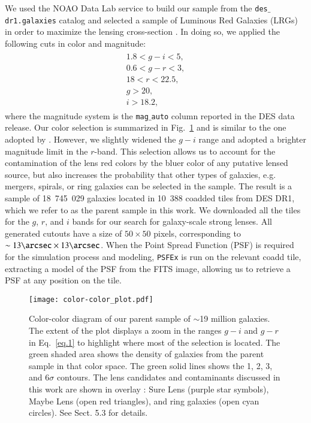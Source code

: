 \documentclass[tradiabstract,twocolumn]{aa}
\begin{document}
We used the NOAO Data Lab \citep{Fitzpatrick2016} service to build our sample from the {\tt des$\_$dr1.galaxies} catalog and selected a sample of Luminous Red Galaxies (LRGs) in order to maximize the lensing cross-section \citep[e.g.][]{Turner1984}. In doing so, we applied the following cuts in color and magnitude: 
%
\begin{eqnarray}
\begin{array}{l}
1.8 < g - i < 5, \\
0.6 < g - r < 3, \\
18 < r < 22.5, \\
g > 20, \\
i > 18.2,
\label{eq.1}
\end{array} 
\end{eqnarray}
% 
\noindent where the magnitude system is the {\tt mag$\_$auto} column reported in the DES data release. Our color selection is summarized in Fig.~\ref{Fig.colorplot} and is similar to the one adopted by \cite{Jacobs2019A}. However, we slightly widened the $g-i$ range and adopted a brighter magnitude limit in the $r$-band. This selection allows us to account for the contamination of the lens red colors by the bluer color of any putative lensed source, but also increases the probability that other types of galaxies, e.g. mergers, spirals, or ring galaxies can be selected in the sample. The result is a sample of 18~745~029 galaxies located in 10~388 coadded tiles from DES DR1, which we refer to as the parent sample in this work. We downloaded all the tiles for the $g$, $r$, and $i$ bands for our search for galaxy-scale strong lenses. All generated cutouts have a size of $50 \times 50$ pixels, corresponding to $\sim 13 \arcsec\times 13 \arcsec$. When the Point Spread Function (PSF) is required for the simulation process and modeling, {\tt PSFEx} \citep{bertin2011} is run on the relevant coadd tile, extracting a model of the PSF from the FITS image, allowing us to retrieve a PSF at any position on the tile.

\begin{figure}[t!]
\centering
\texttt{[image: color-color\_plot.pdf]}
\caption{Color-color diagram of our parent sample of $\sim$19 million galaxies. The extent of the plot displays a zoom in the ranges $g-i$ and $g-r$ in  Eq.~\ref{eq.1} to highlight where most of the selection is located. The green shaded area shows the density of galaxies from the parent sample in that color space. The green solid lines shows the 1, 2, 3, and 6$\sigma$ contours. The lens candidates and contaminants discussed in this work are shown in overlay : Sure Lens (purple star symbols), Maybe Lens (open red triangles), and ring galaxies (open cyan circles). See Sect. 5.3 for details.}
\label{Fig.colorplot}
\end{figure}
\end{document}
